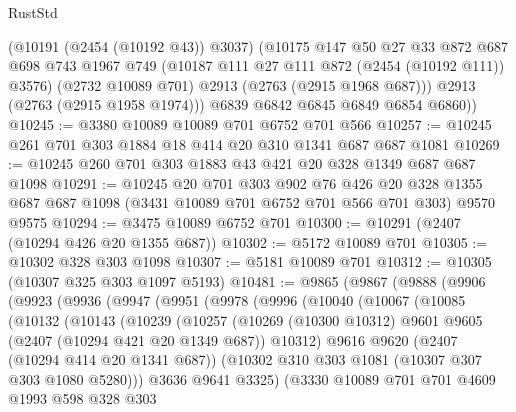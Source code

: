 \begin{lexlean}{RustStd}
\begin{coremodule}
          (@10191 (@2454 (@10192 @43)) @3037)
          (@10175
            @147
            @50
            @27
            @33
            @872
            @687
            @698
            @743
            @1967
            @749
            (@10187 @111 @27 @111 @872 (@2454 (@10192 @111)) @3576)
            (@2732 @10089 @701)
            @2913
            (@2763 (@2915 @1968 @687)))
          @2913
          (@2763 (@2915 @1958 @1974)))
        @6839
        @6842
        @6845
        @6849
        @6854
        @6860))
@10245 := @3380 @10089 @10089 @701 @6752 @701 @566
@10257 := @10245 @261 @701 @303 @1884 @18 @414 @20 @310 @1341 @687 @687 @1081
@10269 := @10245 @260 @701 @303 @1883 @43 @421 @20 @328 @1349 @687 @687 @1098
@10291 := @10245
    @20
    @701
    @303
    @902
    @76
    @426
    @20
    @328
    @1355
    @687
    @687
    @1098
    (@3431 @10089 @701 @6752 @701 @566 @701 @303)
    @9570
    @9575
@10294 := @3475 @10089 @6752 @701
@10300 := @10291 (@2407 (@10294 @426 @20 @1355 @687))
@10302 := @5172 @10089 @701
@10305 := @10302 @328 @303 @1098
@10307 := @5181 @10089 @701
@10312 := @10305 (@10307 @325 @303 @1097 @5193)
@10481 := @9865
    (@9867
      (@9888
        (@9906
          (@9923
            (@9936
              (@9947
                (@9951
                  (@9978
                    (@9996
                      (@10040
                        (@10067
                          (@10085
                            (@10132
                              (@10143
                                (@10239
                                  (@10257
                                    (@10269
                                      (@10300 @10312)
                                      @9601
                                      @9605
                                      (@2407 (@10294 @421 @20 @1349 @687))
                                      @10312)
                                    @9616
                                    @9620
                                    (@2407 (@10294 @414 @20 @1341 @687))
                                    (@10302 @310 @303 @1081 (@10307 @307 @303 @1080 @5280)))
                                  @3636
                                  @9641
                                  @3325)
                                (@3330
                                  @10089
                                  @701
                                  @701
                                  @4609
                                  @1993
                                  @598
                                  @328
                                  @303

\end{coremodule}
\end{lexlean}
